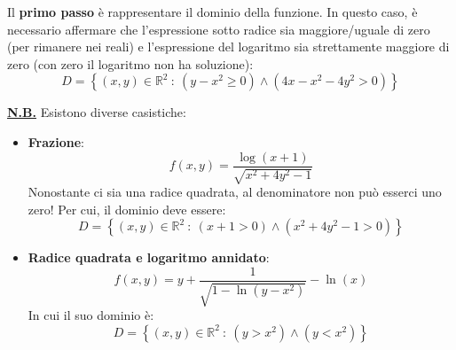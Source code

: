 \documentclass[a4paper]{article}
\begin{document}
	\noindent
	Il \textbf{primo passo} è rappresentare il dominio della funzione. In questo caso, è necessario affermare che l'espressione sotto radice sia maggiore/uguale di zero (per rimanere nei reali) e l'espressione del logaritmo sia strettamente maggiore di zero (con zero il logaritmo non ha soluzione):
	\begin{equation*}
		D = \left\{\left(x,y\right) \in \mathbb{R}^{2} \: : \: \left(y-x^{2} \ge 0\right) \land \left(4x-x^{2}-4y^{2} > 0\right)\right\}
	\end{equation*}
	\begin{mdframed}
		\textbf{\underline{N.B.}} Esistono diverse casistiche:
		\begin{itemize}
			\item \textbf{Frazione}:
			\begin{equation*}
				f\left(x,y\right) = \dfrac{\log\left(x+1\right)}{\sqrt{x^{2}+4y^{2}-1}}
			\end{equation*}
			Nonostante ci sia una radice quadrata, al denominatore non può esserci uno zero! Per cui, il dominio deve essere:
			\begin{equation*}
				D = \left\{\left(x,y\right) \in \mathbb{R}^{2} \: : \: \left(x+1 > 0\right) \land \left(x^{2} +4y^{2} -1 > 0\right)\right\}
			\end{equation*}

			\item \textbf{Radice quadrata e logaritmo annidato}:
			\begin{equation*}
				f\left(x,y\right) = y + \dfrac{1}{\sqrt{1 - \ln\left(y-x^{2}\right)}} - \ln\left(x\right)
			\end{equation*}
			In cui il suo dominio è:
			\begin{equation*}
				D = \left\{\left(x,y\right) \in \mathbb{R}^{2} \: : \: \left(y > x^{2}\right) \land \left(y < x^{2}\right)\right\}
			\end{equation*}
		\end{itemize}
	\end{mdframed}\newpage
	
\end{document}
